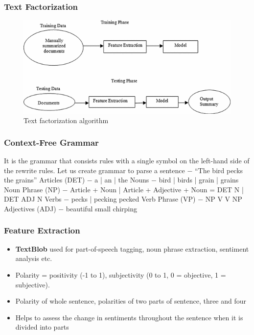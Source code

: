 \documentclass[oneside,a4paper,12pt]{book}
\begin{document}
\subsubsection{Text Factorization}
\begin{figure}[h!]
  \centering
  \includegraphics[width=\linewidth]{txtfact.png}
  \caption{Text factorization algorithm}
\end{figure}
\subsubsection{Context-Free Grammar}
It is the grammar that consists rules with a single symbol on the left-hand side of the rewrite rules. Let us create grammar to parse a sentence − “The bird pecks the grains”
Articles (DET) − a | an | the
Nouns − bird | birds | grain | grains
Noun Phrase (NP) − Article + Noun | Article + Adjective + Noun = DET N | DET ADJ N
Verbs − pecks | pecking  pecked
Verb Phrase (VP) − NP V  V NP
Adjectives (ADJ) − beautiful  small  chirping

\subsubsection{Feature Extraction}
\begin{itemize}
    \item \textbf{TextBlob} used for part-of-speech tagging, noun phrase extraction, sentiment analysis etc.
    \item Polarity = positivity (-1 to 1), subjectivity (0 to 1, 0 = objective, 1 = subjective).
    \item Polarity of whole sentence, polarities of two parts of sentence, three and four
    \item Helps to assess the change in sentiments throughout the sentence when it is divided into parts
\end{itemize}
\end{document}
